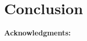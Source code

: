 \documentclass{article} %
\begin{document}

\section{Conclusion}
\medskip \noindent
\textbf{Acknowledgments:}
\small


\end{document}
